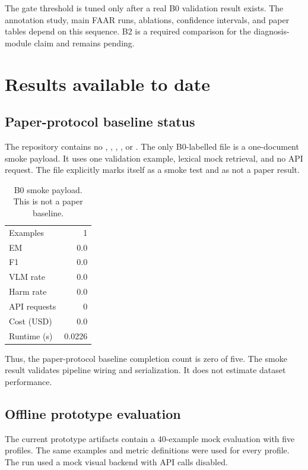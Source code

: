 \documentclass[10pt,twocolumn]{article}
\begin{document}
The gate threshold is tuned only after a real B0 validation result exists. The annotation study, main FAAR runs, ablations, confidence intervals, and paper tables depend on this sequence. B2 is a required comparison for the diagnosis-module claim and remains pending.

\section{Results available to date}

\subsection{Paper-protocol baseline status}

The repository contains no , , , , or . The only B0-labelled file is a one-document smoke payload. It uses one validation example, lexical mock retrieval, and no API request. The file explicitly marks itself as a smoke test and as not a paper result.

\begin{table}[t]
\centering
\caption{B0 smoke payload. This is not a paper baseline.}
\label{tab:smoke}
\small
\begin{tabular}{@{}lr@{}}
\toprule
Examples & 1 \\
EM & 0.0 \\
F1 & 0.0 \\
VLM rate & 0.0 \\
Harm rate & 0.0 \\
API requests & 0 \\
Cost (USD) & 0.0 \\
Runtime (s) & 0.0226 \\
\bottomrule
\end{tabular}
\end{table}

Thus, the paper-protocol baseline completion count is zero of five. The smoke result validates pipeline wiring and serialization. It does not estimate dataset performance.

\subsection{Offline prototype evaluation}

The current prototype artifacts contain a 40-example mock evaluation with five profiles. The same examples and metric definitions were used for every profile. The run used a mock visual backend with API calls disabled.
\end{document}
